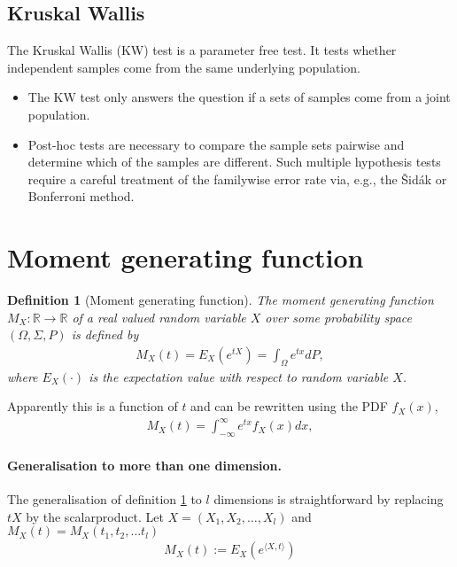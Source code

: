 \documentclass[10pt,a4paper]{article}
\newtheorem{definition}{Definition}
\begin{document}
\subsection{Kruskal Wallis} 
The Kruskal Wallis (KW) test \cite{kruskal_wallis:1952} is a parameter free test. It tests whether independent samples come from the same underlying population.
\begin{itemize}
\item The KW test only answers the question if a sets of samples come from a joint population.
\item Post-hoc tests are necessary to compare the sample sets pairwise and determine which of the samples are different. Such multiple hypothesis tests require a careful treatment of the familywise error rate via, e.g.,  the \v{S}id\'ak or Bonferroni method.
\end{itemize}

\section{Moment generating function}
\begin{definition}[Moment generating function] \label{def_moment_generating_function}
The moment generating function $M_X :  \mathbb R \rightarrow \mathbb R$
of a real valued random variable $X$ over some probability space $(\Omega, \Sigma, P)$  
is defined by
\begin{align}
M_X(t) = E_X(e^{tX}) =\int_{\Omega} e^{tx} dP,
\end{align}
where $E_X(\cdot)$ is the expectation value with respect to random variable $X$.
\end{definition} 
Apparently this is a function of $t$ and can be rewritten using the PDF $f_X(x)$,
\begin{align}
M_X(t)  =\int_{-\infty}^{\infty} e^{tx} f_X(x) dx,
\end{align}

\paragraph*{Generalisation to more than one dimension.} The generalisation of definition  \ref{def_moment_generating_function} to $l$ dimensions is straightforward by replacing $tX$ by the scalarproduct. Let $X=(X_1, X_2, \dots, X_l)$ and $M_X(t) = M_X(t_1, t_2, \dots t_l) $
\begin{align}
M_X(t) := E_X\left(e^{\langle X, t \rangle}\right)
\end{align}
\end{document}
